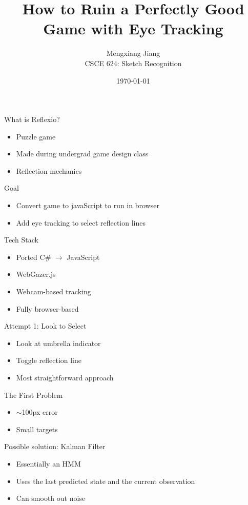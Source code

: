 \documentclass{beamer}
\title{How to Ruin a Perfectly Good Game with Eye Tracking}
\author{Mengxiang Jiang\\
CSCE 624: Sketch Recognition}
\date{\today}
\begin{document}
\frame{\titlepage}

\begin{frame}{What is Reflexio?}
\begin{itemize}
    \item Puzzle game
    \item Made during undergrad game design class
    \item Reflection mechanics
\end{itemize}
\end{frame}

\begin{frame}{Goal}
\begin{itemize}
    \item Convert game to javaScript to run in browser
    \item Add eye tracking to select reflection lines
\end{itemize}
\end{frame}

\begin{frame}{Tech Stack}
\begin{itemize}
    \item Ported C\# $\rightarrow$ JavaScript
    \item WebGazer.js
    \item Webcam-based tracking
    \item Fully browser-based
\end{itemize}
\end{frame}

\begin{frame}{Attempt 1: Look to Select}
\begin{itemize}
    \item Look at umbrella indicator
    \item Toggle reflection line
    \item Most straightforward approach
\end{itemize}
\end{frame}

\begin{frame}{The First Problem}
\begin{itemize}
    \item $\sim$100px error
    \item Small targets
\end{itemize}
\end{frame}

\begin{frame}{Possible solution: Kalman Filter}
\begin{itemize}
    \item Essentially an HMM
    \item Uses the last predicted state and the current observation
    \item Can smooth out noise
\end{itemize}
\end{frame}
\end{document}
